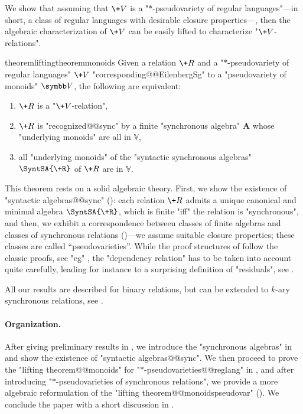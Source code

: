We show that assuming that $\+V$ is a "$*$-pseudovariety of regular languages"---in short, a class of regular languages with desirable closure properties---, then the algebraic characterization of $\+V$ can be easily lifted to characterize "$\+V$-relations".

\begin{restatable*}{theorem}{liftingtheoremmonoids}
	\AP\label{thm:lifting-theorem-monoids}
	Given a relation $\+R$ and a "$\ast$-pseudovariety of regular languages" $\+V$
	"corresponding@@EilenbergSg" to a "pseudovariety of monoids" $\B{V}$,
	the following are equivalent:
	\begin{enumerate}
		\item $\+R$ is a "$\+V$-relation",
		\item $\+R$ is "recognized@@sync" by a finite "synchronous algebra" $\mathbf{A}$
			whose "underlying monoids" are all in $\mathbb{V}$,
		\item all "underlying monoids" of the "syntactic synchronous algebras" $\SyntSA{\+R}$ of
			$\+R$ are in $\mathbb{V}$.
	\end{enumerate} 
\end{restatable*}

This theorem rests on a solid algebraic theory. 
First, we show the existence of "syntactic algebras@@sync" (): 
each relation $\+R$ admits a unique canonical and minimal algebra $\SyntSA{\+R}$, which is finite 
"iff" the relation is "synchronous",
and then, we exhibit a correspondence between classes of finite algebras and classes of
synchronous relations ()---we assume suitable closure properties; these classes are called ``pseudovarieties''.
While the proof structures of  follow the classic proofs, see "eg" \cite{Pin2022MathematicalFoundations},
the "dependency relation" has to be taken into account quite carefully, leading for instance
to a surprising definition of "residuals", see .

\begin{remark}
	All our results are described for binary relations, but can be extended to
	$k$-ary synchronous relations, see .
\end{remark}

\paragraph*{Organization.} After giving preliminary results in , we introduce
the "synchronous algebras" in  and show the existence of
"syntactic algebras@@sync". We then proceed to prove the "lifting theorem@@monoids" for 
"$*$-pseudovarieties@@reglang" in , and after introducing "$*$-pseudovarieties of synchronous relations", we provide a more algebraic reformulation of the "lifting 
theorem@@monoidspseudovar" ().
We conclude the paper with
a short discussion in .


